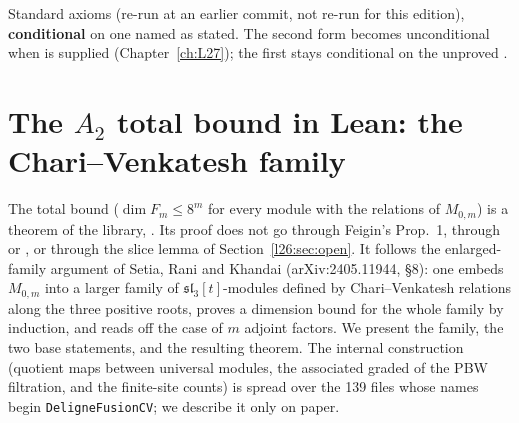 \begin{status}
Standard axioms (re-run at an earlier commit, not re-run for this edition), \textbf{conditional} on one named  as stated. The second form
becomes unconditional when  is supplied (Chapter~\ref{ch:L27}); the first stays conditional on the
unproved .
\end{status}

\section[The $A_2$ total bound in Lean]{The $A_2$ total bound in Lean: the Chari--Venkatesh family}\label{l26:sec:cv}

The total bound  ($\dim F_m\le8^m$ for every module with the relations of $M_{0,m}$) is a theorem of the
library, . Its proof does not go through Feigin's Prop.~1, through  or
, or through the slice lemma of Section~\ref{l26:sec:open}. It follows the enlarged-family argument of
Setia, Rani and Khandai (arXiv:2405.11944, \S8): one embeds $M_{0,m}$ into a larger family of $\mathfrak{sl}_3[t]$-modules defined by
Chari--Venkatesh relations along the three positive roots, proves a dimension bound for the whole family by induction, and reads
off the case of $m$ adjoint factors. We present the family, the two base statements, and the resulting theorem. The internal
construction (quotient maps between universal modules, the associated graded of the PBW filtration, and the finite-site
counts) is spread over the 139 files whose names begin \texttt{DeligneFusionCV}; we describe it only on paper.

